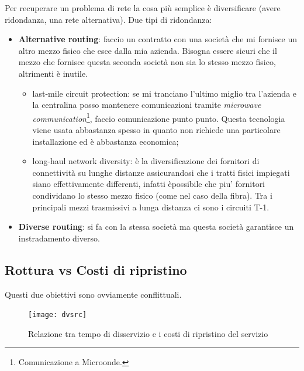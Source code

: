Per recuperare un problema di rete la cosa più semplice è diversificare (avere
ridondanza, una rete alternativa). Due tipi di ridondanza:
\begin{itemize}
  \item \textbf{Alternative routing}: faccio un contratto con una società che
  mi fornisce un altro mezzo fisico che esce dalla mia azienda. Bisogna essere
  sicuri che il mezzo che fornisce questa seconda società non sia lo stesso
  mezzo fisico, altrimenti è inutile.
  \begin{itemize}
    \item last-mile circuit protection: se mi tranciano l'ultimo miglio tra
    l'azienda e la centralina posso mantenere comunicazioni tramite
    \textit{microwave communication}\footnote{Comunicazione a Microonde.},
    faccio comunicazione punto punto. Questa tecnologia viene usata abbastanza 
    spesso in quanto non richiede una particolare installazione ed è abbastanza 
    economica;
    \item long-haul network diversity: è la diversificazione dei fornitori di
    connettività su lunghe distanze assicurandosi che i tratti fisici impiegati 
    siano effettivamente differenti, infatti èpossibile che piu' fornitori 
    condividano lo stesso mezzo fisico (come nel caso della fibra). Tra i 
    principali mezzi trasmissivi a lunga distanza ci sono i circuiti T-1.
  \end{itemize}
  \item \textbf{Diverse routing}: si fa con la stessa società ma questa società
  garantisce un instradamento diverso.
\end{itemize}

\subsection{Rottura vs Costi di ripristino}

Questi due obiettivi sono ovviamente conflittuali.

\begin{figure}[H]
  \centering
  \texttt{[image: dvsrc]}
  \caption{Relazione tra tempo di disservizio e i costi di ripristino del
  servizio}
\end{figure}

